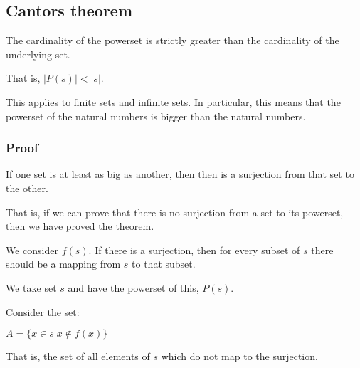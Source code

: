 
\subsection{Cantors theorem}

The cardinality of the powerset is strictly greater than the cardinality of the underlying set.

That is, \(|P(s)|<|s|\).

This applies to finite sets and infinite sets. In particular, this means that the powerset of the natural numbers is bigger than the natural numbers.

\subsubsection{Proof}

If one set is at least as big as another, then then is a surjection from that set to the other.

That is, if we can prove that there is no surjection from a set to its powerset, then we have proved the theorem.

We consider \(f(s)\). If there is a surjection, then for every subset of \(s\) there should be a mapping from \(s\) to that subset.

We take set \(s\) and have the powerset of this, \(P(s)\).

Consider the set:

\(A=\{x\in s|x\nin f(x)\}\)

That is, the set of all elements of \(s\) which do not map to the surjection.


